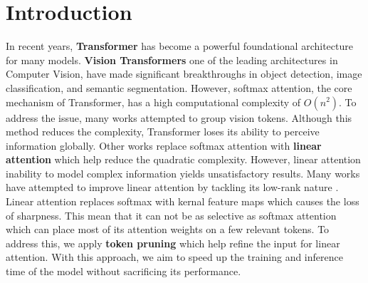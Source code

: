 \section{Introduction}

In recent years, \textbf{Transformer} \cite{vaswani2017attention} has become a powerful foundational architecture for many models.
\textbf{Vision Transformers} \cite{dosovitskiy2020image} one of the leading architectures in Computer Vision, have made significant breakthroughs
in object detection, image classification, and semantic segmentation.
However, softmax attention, the core mechanism of Transformer, has a high computational complexity of \( O(n^2) \).
To address the issue, many works attempted to group vision tokens. Although this method reduces the complexity,
Transformer loses its ability to perceive information globally.
Other works replace softmax attention with \textbf{linear attention} which help reduce the quadratic complexity.
However, linear attention inability to model complex information yields unsatisfactory results.
Many works have attempted to improve linear attention by tackling its low-rank nature \cite{fan2025breaking}.
Linear attention replaces softmax with kernal feature maps which causes the loss of sharpness.
This mean that it can not be as selective as softmax attention which can place most of its attention weights on a few relevant tokens.
To address this, we apply \textbf{token pruning} \cite{rao2021dynamicvit,lu2025reinforcement} which help refine the input for linear attention.
With this approach, we aim to speed up the training and inference time of the model without sacrificing its performance.



